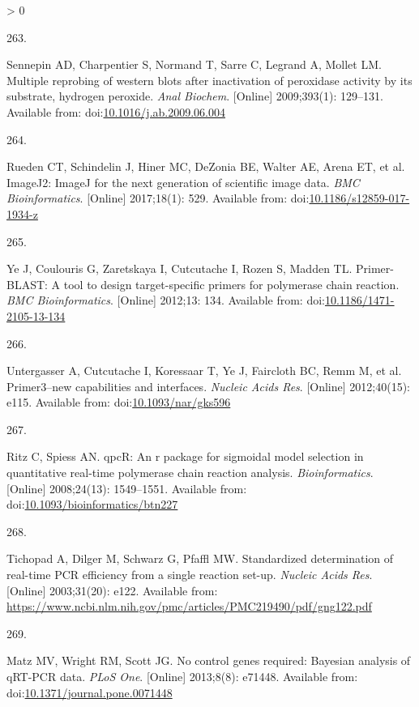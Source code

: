 \documentclass[twoside,10pt]{gihclass} %
\newlength{\cslhangindent}
\newlength{\csllabelwidth}
\newenvironment{CSLReferences}[3] %
 {%
  \setlength{\parindent}{0pt}
  \ifodd #1 \everypar{\setlength{\hangindent}{\cslhangindent}}\ignorespaces\fi
  \ifnum #2 > 0
  \setlength{\parskip}{#2\baselineskip}
  \fi
 }%
 {}
\newcommand{\CSLLeftMargin}[1]{\parbox[t]{\maxof{\widthof{#1}}{\csllabelwidth}}{#1}}
\newcommand{\CSLRightInline}[1]{\parbox[t]{\linewidth}{#1}}
\begin{document}
\begin{CSLReferences}{0}{0}
\leavevmode\hypertarget{ref-RN1930}{}%
\CSLLeftMargin{263. }
\CSLRightInline{Sennepin AD, Charpentier S, Normand T, Sarre C, Legrand A, Mollet LM. Multiple reprobing of western blots after inactivation of peroxidase activity by its substrate, hydrogen peroxide. \emph{Anal Biochem}. {[}Online{]} 2009;393(1): 129--131. Available from: doi:\href{https://doi.org/10.1016/j.ab.2009.06.004}{10.1016/j.ab.2009.06.004}}

\leavevmode\hypertarget{ref-RN2259}{}%
\CSLLeftMargin{264. }
\CSLRightInline{Rueden CT, Schindelin J, Hiner MC, DeZonia BE, Walter AE, Arena ET, et al. ImageJ2: ImageJ for the next generation of scientific image data. \emph{BMC Bioinformatics}. {[}Online{]} 2017;18(1): 529. Available from: doi:\href{https://doi.org/10.1186/s12859-017-1934-z}{10.1186/s12859-017-1934-z}}

\leavevmode\hypertarget{ref-RN1815}{}%
\CSLLeftMargin{265. }
\CSLRightInline{Ye J, Coulouris G, Zaretskaya I, Cutcutache I, Rozen S, Madden TL. Primer-BLAST: A tool to design target-specific primers for polymerase chain reaction. \emph{BMC Bioinformatics}. {[}Online{]} 2012;13: 134. Available from: doi:\href{https://doi.org/10.1186/1471-2105-13-134}{10.1186/1471-2105-13-134}}

\leavevmode\hypertarget{ref-RN1816}{}%
\CSLLeftMargin{266. }
\CSLRightInline{Untergasser A, Cutcutache I, Koressaar T, Ye J, Faircloth BC, Remm M, et al. Primer3--new capabilities and interfaces. \emph{Nucleic Acids Res}. {[}Online{]} 2012;40(15): e115. Available from: doi:\href{https://doi.org/10.1093/nar/gks596}{10.1093/nar/gks596}}

\leavevmode\hypertarget{ref-RN1768}{}%
\CSLLeftMargin{267. }
\CSLRightInline{Ritz C, Spiess AN. qpcR: An r package for sigmoidal model selection in quantitative real-time polymerase chain reaction analysis. \emph{Bioinformatics}. {[}Online{]} 2008;24(13): 1549--1551. Available from: doi:\href{https://doi.org/10.1093/bioinformatics/btn227}{10.1093/bioinformatics/btn227}}

\leavevmode\hypertarget{ref-RN1934}{}%
\CSLLeftMargin{268. }
\CSLRightInline{Tichopad A, Dilger M, Schwarz G, Pfaffl MW. Standardized determination of real-time PCR efficiency from a single reaction set-up. \emph{Nucleic Acids Res}. {[}Online{]} 2003;31(20): e122. Available from: \url{https://www.ncbi.nlm.nih.gov/pmc/articles/PMC219490/pdf/gng122.pdf}}

\leavevmode\hypertarget{ref-RN1964}{}%
\CSLLeftMargin{269. }
\CSLRightInline{Matz MV, Wright RM, Scott JG. No control genes required: Bayesian analysis of qRT-PCR data. \emph{PLoS One}. {[}Online{]} 2013;8(8): e71448. Available from: doi:\href{https://doi.org/10.1371/journal.pone.0071448}{10.1371/journal.pone.0071448}}


\end{CSLReferences}
\end{document}
